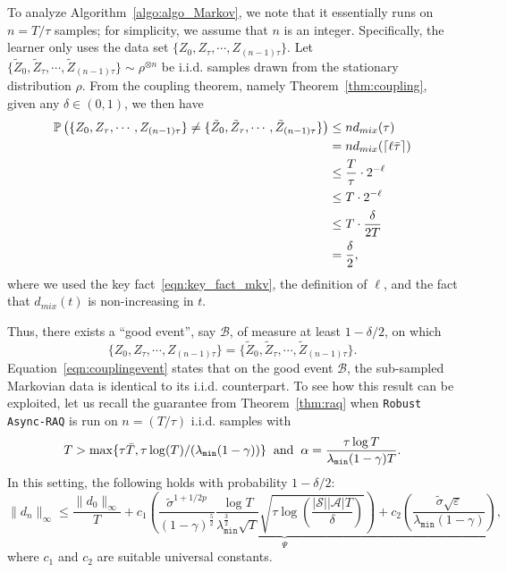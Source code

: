 \documentclass{article}
\newcommand{\mc}{\mathcal}
\DeclarePairedDelimiter{\ceil}{\lceil}{\rceil}
\begin{document}
To analyze Algorithm~\ref{algo:algo_Markov}, we note that it essentially runs on $n=T/\tau$ samples; for simplicity, we assume that $n$ is an integer. 
Specifically, the learner only uses the data set $\{Z_{0},Z_{\tau},\cdots, Z_{(n-1)\tau}\}$. Let $\{\tilde Z_{0}, \tilde Z_{\tau},\cdots, \tilde Z_{(n-1)\tau}\}\sim\rho^{\otimes n}$ be i.i.d. samples drawn from the stationary distribution $\rho$. From the coupling theorem, namely Theorem~\ref{thm:coupling}, given any $\delta\in(0,1)$, we then have
\begin{equation}
\label{eqn:Bc_bnd}
\begin{aligned}
    \mathbb{P}\left({\{Z_{0},Z_{\tau},\cdots, Z_{(n-1)\tau}\}\neq \{\tilde Z_{0}, \tilde Z_{\tau},\cdots, \tilde Z_{(n-1)\tau}\}}\right)&\leq n d_{mix}(\tau)\\
    & = n d_{mix}(\ceil{\ell\bar\tau})\\
    &\leq \frac{T}{\tau} \cdot 2^{-\ell}\\
    &\leq T\cdot 2^{-\ell}\\
    &\leq T\cdot\frac{\delta}{2T}\\
    &=\frac{\delta}{2},
\end{aligned}
\end{equation}
where we used the key fact~\eqref{eqn:key_fact_mkv}, the definition of $\ell$, and the fact that $d_{mix}(t)$ is non-increasing in $t$.

Thus, there exists a ``good event'', say $\mc{B}$, of measure at least $1-\delta/2$, on which
\begin{equation}
    \{Z_{0},Z_{\tau},\cdots, Z_{(n-1)\tau}\}= \{\tilde Z_{0}, \tilde Z_{\tau},\cdots, \tilde Z_{(n-1)\tau}\}. 
 \label{eqn:couplingevent}
\end{equation}
Equation~\eqref{eqn:couplingevent} states that on the good event $\mc{B}$, the sub-sampled Markovian data is identical to its i.i.d. counterpart. To see how this result can be exploited, let us recall the guarantee from Theorem~\ref{thm:raq} when \texttt{Robust Async-RAQ} is run on $n=(T/\tau)$ i.i.d. samples with 
$$T > \max \{\tau \bar{T}, \tau \log(T)/(\lambda_{\texttt{min}}(1-\gamma))\} \hspace{2mm} \textrm{and} \hspace{2mm} \alpha = \frac{\tau \log T}{\lambda_{\texttt{min}}(1-\gamma)T}.$$ 
In this setting, the following holds with probability $1-\delta/2$: 
\begin{equation}
\lVert d_n \rVert_{\infty} \leq \underbrace{\frac{\lVert d_0 \rVert_{\infty}}{T} + c_1\left( \frac{\tilde{\sigma}^{1+1/2p}}{(1-\gamma)^{\frac{5}{2}}}  \frac{\log T}{\lambda_{\texttt{min}}^{\frac{3}{2}}\sqrt{T}} \sqrt{\tau \log \left( \frac{|\mathcal{S}||\mathcal{A}|T}{\delta}\right)} \right) +  c_2\left(\frac{\tilde{\sigma}\sqrt{\varepsilon}}{\lambda_{\texttt{min}}(1-\gamma)}\right)}_{\Psi}, 
\label{eqn:mainbnd_iid}
\end{equation}
where $c_1$ and $c_2$ are suitable universal constants. 
\end{document}
